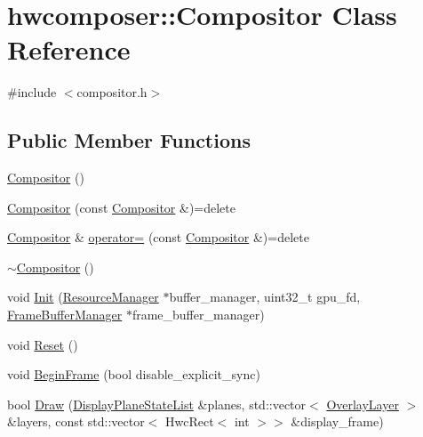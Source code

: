 \hypertarget{classhwcomposer_1_1Compositor}{}\section{hwcomposer\+:\+:Compositor Class Reference}
\label{classhwcomposer_1_1Compositor}


{\ttfamily \#include $<$compositor.\+h$>$}

\subsection*{Public Member Functions}
\begin{DoxyCompactItemize}
\item 
\mbox{\hyperlink{classhwcomposer_1_1Compositor_a250a64e1755ec44fdd1daccc3e568ae8}{Compositor}} ()
\item 
\mbox{\hyperlink{classhwcomposer_1_1Compositor_a0f17100bfab3e60f3f705ae491e5e664}{Compositor}} (const \mbox{\hyperlink{classhwcomposer_1_1Compositor}{Compositor}} \&)=delete
\item 
\mbox{\hyperlink{classhwcomposer_1_1Compositor}{Compositor}} \& \mbox{\hyperlink{classhwcomposer_1_1Compositor_a12222f05927fd066716497c72377c4ab}{operator=}} (const \mbox{\hyperlink{classhwcomposer_1_1Compositor}{Compositor}} \&)=delete
\item 
\mbox{\hyperlink{classhwcomposer_1_1Compositor_ae3ab0f1e2b38db1b6bb044675bfd8644}{$\sim$\+Compositor}} ()
\item 
void \mbox{\hyperlink{classhwcomposer_1_1Compositor_a5ad90c739aabb16ec737b9b6f8ceb991}{Init}} (\mbox{\hyperlink{classhwcomposer_1_1ResourceManager}{Resource\+Manager}} $\ast$buffer\+\_\+manager, uint32\+\_\+t gpu\+\_\+fd, \mbox{\hyperlink{classhwcomposer_1_1FrameBufferManager}{Frame\+Buffer\+Manager}} $\ast$frame\+\_\+buffer\+\_\+manager)
\item 
void \mbox{\hyperlink{classhwcomposer_1_1Compositor_a9e48d65a1b926f921acccccba51b69dc}{Reset}} ()
\item 
void \mbox{\hyperlink{classhwcomposer_1_1Compositor_a2a9da9e986a230cb68e322ed18ba4866}{Begin\+Frame}} (bool disable\+\_\+explicit\+\_\+sync)
\item 
bool \mbox{\hyperlink{classhwcomposer_1_1Compositor_ad1b2b9db52224ab8e5ae906df0c58a28}{Draw}} (\mbox{\hyperlink{namespacehwcomposer_adf383ae435d39a5631a8ad82e7fa18a4}{Display\+Plane\+State\+List}} \&planes, std\+::vector$<$ \mbox{\hyperlink{structhwcomposer_1_1OverlayLayer}{Overlay\+Layer}} $>$ \&layers, const std\+::vector$<$ Hwc\+Rect$<$ int $>$$>$ \&display\+\_\+frame)
$$
\end{DoxyCompactItemize}
